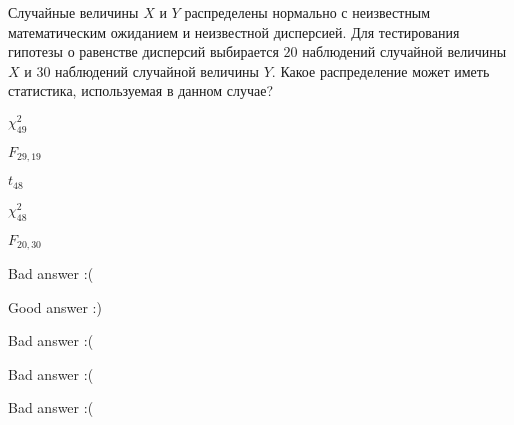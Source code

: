 
\begin{question}
Случайные величины \(X\) и \(Y\) распределены нормально с неизвестным
математическим ожиданием и неизвестной дисперсией. Для тестирования
гипотезы о равенстве дисперсий выбирается \(20\) наблюдений случайной
величины \(X\) и \(30\) наблюдений случайной величины \(Y\). Какое
распределение может иметь статистика, используемая в данном случае?
\begin{answerlist}
  \item \(\chi^2_{49}\)
  \item \(F_{29,19}\)
  \item \(t_{48}\)
  \item \(\chi^2_{48}\)
  \item \(F_{20,30}\)
\end{answerlist}
\end{question}

\begin{solution}
\begin{answerlist}
  \item Bad answer :(
  \item Good answer :)
  \item Bad answer :(
  \item Bad answer :(
  \item Bad answer :(
\end{answerlist}
\end{solution}

